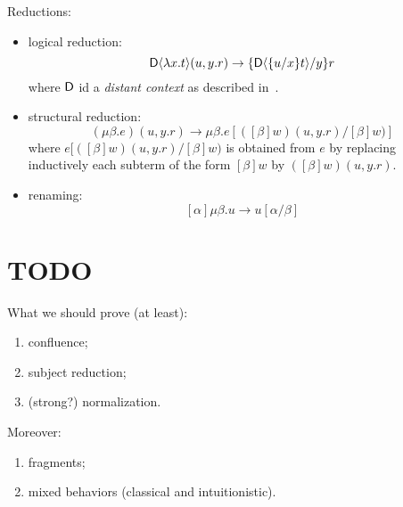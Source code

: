Reductions:
\begin{itemize}
\item logical reduction:
\[\mathsf{D}\langle \lambda x.t\rangle(u,y.r)\to \{\mathsf{D}\langle\{u/x\}t\rangle/y\}r
\]
where $\mathsf{D}$ id a {\em distant context} as described in~\cite{DBLP:conf/fossacs/SantoKP22}.
\item  structural reduction: 
\[
(\mu\beta. e)(u,y.r) \to\mu\beta.e[([\beta]w)(u,y.r)/[\beta]w)]
\]
where $e[([\beta]w)(u,y.r)/[\beta]w)$ is obtained from $e$ by replacing inductively each subterm of the form $[\beta]w$ by $([\beta]w)(u,y.r)$.
\item renaming:
\[
[\alpha]\mu\beta.u\to u[\alpha/\beta]
\]
\end{itemize}



\section{TODO}
What we should prove (at least):
\begin{enumerate}
\item confluence;
\item subject reduction;
\item (strong?) normalization.
\end{enumerate}

Moreover: 
\begin{enumerate}
\item fragments;
\item mixed behaviors (classical and intuitionistic).
\end{enumerate}
\fi